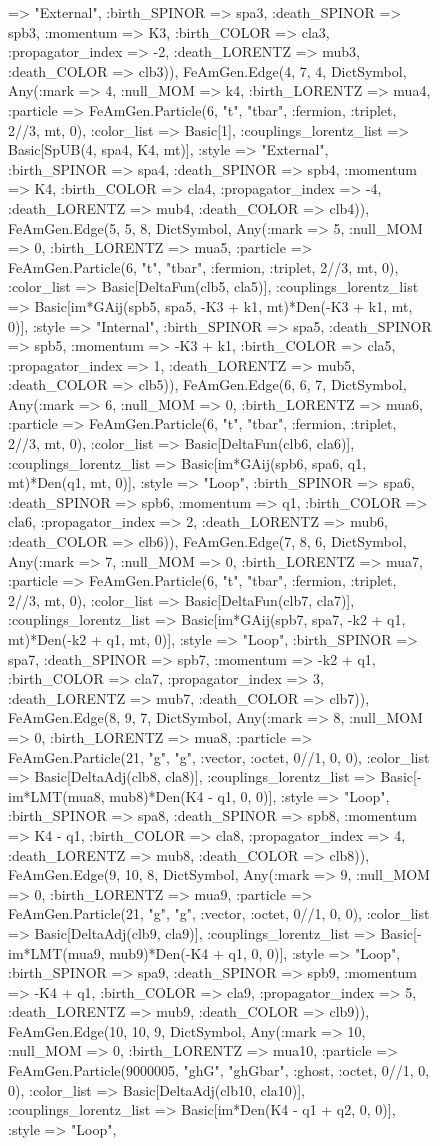 \documentclass{revtex4}
\begin{document}
\begin{figure}[!htb]
\begin{center}
{=> "External", :birth_SPINOR => spa3, :death_SPINOR => spb3, :momentum => K3, :birth_COLOR => cla3, :propagator_index => -2, :death_LORENTZ => mub3, :death_COLOR => clb3)), FeAmGen.Edge(4, 7, 4, Dict{Symbol, Any}(:mark => 4, :null_MOM => k4, :birth_LORENTZ => mua4, :particle => FeAmGen.Particle(6, "t", "tbar", :fermion, :triplet, 2//3, mt, 0), :color_list => Basic[1], :couplings_lorentz_list => Basic[SpUB(4, spa4, K4, mt)], :style => "External", :birth_SPINOR => spa4, :death_SPINOR => spb4, :momentum => K4, :birth_COLOR => cla4, :propagator_index => -4, :death_LORENTZ => mub4, :death_COLOR => clb4)), FeAmGen.Edge(5, 5, 8, Dict{Symbol, Any}(:mark => 5, :null_MOM => 0, :birth_LORENTZ => mua5, :particle => FeAmGen.Particle(6, "t", "tbar", :fermion, :triplet, 2//3, mt, 0), :color_list => Basic[DeltaFun(clb5, cla5)], :couplings_lorentz_list => Basic[im*GAij(spb5, spa5, -K3 + k1, mt)*Den(-K3 + k1, mt, 0)], :style => "Internal", :birth_SPINOR => spa5, :death_SPINOR => spb5, :momentum => -K3 + k1, :birth_COLOR => cla5, :propagator_index => 1, :death_LORENTZ => mub5, :death_COLOR => clb5)), FeAmGen.Edge(6, 6, 7, Dict{Symbol, Any}(:mark => 6, :null_MOM => 0, :birth_LORENTZ => mua6, :particle => FeAmGen.Particle(6, "t", "tbar", :fermion, :triplet, 2//3, mt, 0), :color_list => Basic[DeltaFun(clb6, cla6)], :couplings_lorentz_list => Basic[im*GAij(spb6, spa6, q1, mt)*Den(q1, mt, 0)], :style => "Loop", :birth_SPINOR => spa6, :death_SPINOR => spb6, :momentum => q1, :birth_COLOR => cla6, :propagator_index => 2, :death_LORENTZ => mub6, :death_COLOR => clb6)), FeAmGen.Edge(7, 8, 6, Dict{Symbol, Any}(:mark => 7, :null_MOM => 0, :birth_LORENTZ => mua7, :particle => FeAmGen.Particle(6, "t", "tbar", :fermion, :triplet, 2//3, mt, 0), :color_list => Basic[DeltaFun(clb7, cla7)], :couplings_lorentz_list => Basic[im*GAij(spb7, spa7, -k2 + q1, mt)*Den(-k2 + q1, mt, 0)], :style => "Loop", :birth_SPINOR => spa7, :death_SPINOR => spb7, :momentum => -k2 + q1, :birth_COLOR => cla7, :propagator_index => 3, :death_LORENTZ => mub7, :death_COLOR => clb7)), FeAmGen.Edge(8, 9, 7, Dict{Symbol, Any}(:mark => 8, :null_MOM => 0, :birth_LORENTZ => mua8, :particle => FeAmGen.Particle(21, "g", "g", :vector, :octet, 0//1, 0, 0), :color_list => Basic[DeltaAdj(clb8, cla8)], :couplings_lorentz_list => Basic[-im*LMT(mua8, mub8)*Den(K4 - q1, 0, 0)], :style => "Loop", :birth_SPINOR => spa8, :death_SPINOR => spb8, :momentum => K4 - q1, :birth_COLOR => cla8, :propagator_index => 4, :death_LORENTZ => mub8, :death_COLOR => clb8)), FeAmGen.Edge(9, 10, 8, Dict{Symbol, Any}(:mark => 9, :null_MOM => 0, :birth_LORENTZ => mua9, :particle => FeAmGen.Particle(21, "g", "g", :vector, :octet, 0//1, 0, 0), :color_list => Basic[DeltaAdj(clb9, cla9)], :couplings_lorentz_list => Basic[-im*LMT(mua9, mub9)*Den(-K4 + q1, 0, 0)], :style => "Loop", :birth_SPINOR => spa9, :death_SPINOR => spb9, :momentum => -K4 + q1, :birth_COLOR => cla9, :propagator_index => 5, :death_LORENTZ => mub9, :death_COLOR => clb9)), FeAmGen.Edge(10, 10, 9, Dict{Symbol, Any}(:mark => 10, :null_MOM => 0, :birth_LORENTZ => mua10, :particle => FeAmGen.Particle(9000005, "ghG", "ghGbar", :ghost, :octet, 0//1, 0, 0), :color_list => Basic[DeltaAdj(clb10, cla10)], :couplings_lorentz_list => Basic[im*Den(K4 - q1 + q2, 0, 0)], :style => "Loop", }
\end{center}
\end{figure}
\end{document}
